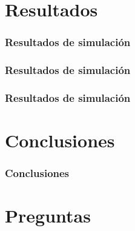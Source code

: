 \documentclass{beamer}
\begin{document}
\section{Resultados}
\begin{frame}
\frametitle{Resultados de simulación}

\end{frame}
\begin{frame}
\frametitle{Resultados de simulación}

\end{frame}
\begin{frame}
\frametitle{Resultados de simulación}

\end{frame}


\section{Conclusiones}
\begin{frame}
\frametitle{Conclusiones}

\end{frame}

\section{Preguntas}
\begin{frame}

\end{frame}
\end{document}
